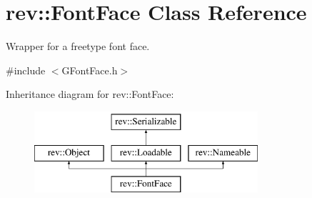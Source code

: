 \hypertarget{classrev_1_1_font_face}{}\section{rev\+::Font\+Face Class Reference}
\label{classrev_1_1_font_face}


Wrapper for a freetype font face.  




{\ttfamily \#include $<$G\+Font\+Face.\+h$>$}

Inheritance diagram for rev\+::Font\+Face\+:\begin{figure}[H]
\begin{center}
\leavevmode
\includegraphics[height=3.000000cm]{classrev_1_1_font_face}
\end{center}
\end{figure}

